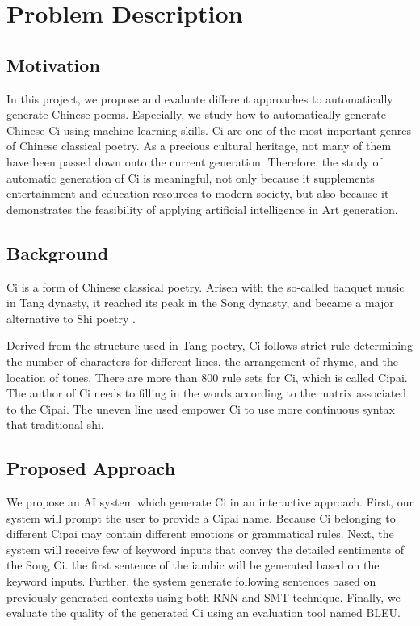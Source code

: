 \section{Problem Description}
\subsection{Motivation}
In this project, we propose and evaluate different approaches to automatically generate Chinese poems. 
%
Especially, we study how to automatically generate Chinese Ci using machine learning skills.
%
Ci are one of the most important genres of Chinese classical poetry. 
%
As a precious cultural heritage, not many of them have been passed down onto the current generation.
%
Therefore, the study of automatic generation of Ci is meaningful, not only because it supplements entertainment and education resources to modern society, but also because it demonstrates the feasibility of applying artificial intelligence in Art generation. 
%

\subsection{Background}
Ci is a form of Chinese classical poetry. Arisen with the so-called banquet music in Tang dynasty, it reached its peak in the Song dynasty, and became a major alternative to Shi poetry\cite{cai2008chinesepoetry} .

Derived from the structure used in Tang poetry, Ci follows strict rule determining the number of characters for different lines, the arrangement of rhyme, and the location of tones. There are more than 800 rule sets for Ci, which is called Cipai\cite{wikici}. The author of Ci needs to filling in the words according to the matrix associated to the Cipai. The uneven line used empower Ci to use more continuous syntax that traditional shi\cite{cai2008chinesepoetry}.

\subsection{Proposed Approach}
We propose an AI system which generate Ci in an interactive approach.
%
First, our system will prompt the user to provide a Cipai name.
%
Because Ci belonging to different Cipai may contain different emotions or grammatical rules.
%
Next, the system will receive few of keyword inputs that convey the detailed sentiments of the Song Ci.
%
the first sentence of the iambic will be generated based on the keyword inputs.
%
Further, the system generate following sentences based on previously-generated contexts using both RNN and SMT technique.
%
Finally, we evaluate the quality of the generated Ci using an evaluation tool named BLEU.

